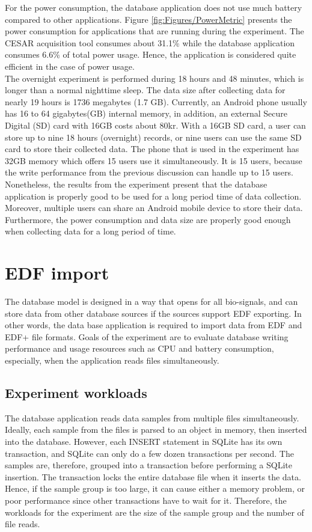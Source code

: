 For the power consumption, the database application does not use much battery compared to other applications. Figure \ref{fig:Figures/PowerMetric} presents the power consumption for applications that are running during the experiment. The CESAR acquisition tool consumes about 31.1\% while the database application consumes 6.6\% of total power usage. Hence, the application is considered quite efficient in the case of power usage.\\
The overnight experiment is performed during 18 hours and 48 minutes, which is longer than a normal nighttime sleep. The data size after collecting data for nearly 19 hours is 1736 megabytes (1.7 GB). Currently, an Android phone usually has 16 to 64 gigabytes(GB) internal memory, in addition, an external Secure Digital (SD) card with 16GB costs about 80kr. With a 16GB SD card, a user can store up to nine 18 hours (overnight) records, or nine users can use the same SD card to store their collected data. The phone that is used in the experiment has 32GB memory which offers 15 users use it simultaneously. It is 15 users, because the write performance from the previous discussion can handle up to 15 users.\\
Nonetheless, the results from the experiment present that the database application is properly good to be used for a long period time of data collection. Moreover, multiple users can share an Android mobile device to store their data. Furthermore, the power consumption and data size are properly good enough when collecting data for a long period of time.
\section{EDF import}
The database model is designed in a way that opens for all bio-signals, and can store data from other database sources if the sources support EDF exporting. In other words, the data base application is required to import data from EDF and EDF+ file formats. Goals of the experiment are to evaluate database writing performance and usage resources such as CPU and battery consumption, especially, when the application reads files simultaneously.
\subsection{Experiment workloads}
The database application reads data samples from multiple files simultaneously. Ideally, each sample from the files is parsed to an object in memory, then inserted into the database. However, each INSERT statement in SQLite has its own transaction, and SQLite can only do a few dozen transactions per second. The samples are, therefore, grouped into a transaction before performing a SQLite insertion. The transaction locks the entire database file when it inserts the data. Hence, if the sample group is too large, it can cause either a memory problem, or poor performance since other transactions have to wait for it. Therefore, the workloads for the experiment are the size of the sample group and the number of file reads.
